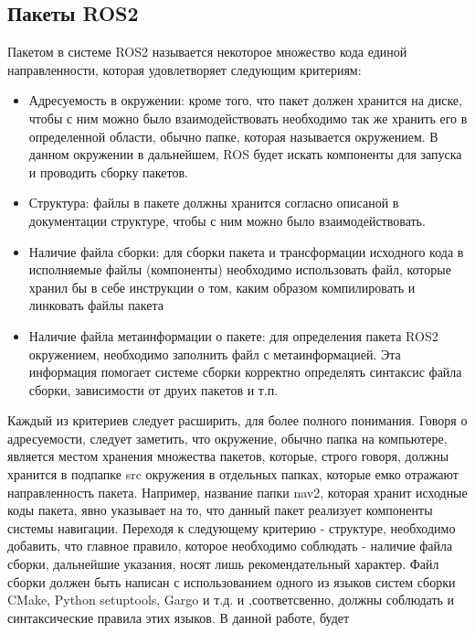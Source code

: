 \documentclass[a4paper, 14pt]{extreport}
\begin{document}
\subsection{Пакеты ROS2}
\par\noindent Пакетом в системе ROS2 называется некоторое множество кода единой направленности, которая удовлетворяет следующим
 критериям:
\begin{itemize}
        \item Адресуемость в окружении: кроме того, что пакет должен хранится на диске, чтобы с ним можно было взаимодействовать
              необходимо так же хранить его в определенной области, обычно папке, которая называется окружением. В данном окружении
              в дальнейшем, ROS будет искать компоненты для запуска и проводить сборку пакетов.
        \item Структура: файлы в пакете должны хранится согласно описаной в документации структуре, чтобы с ним можно было взаимодействовать.
        \item Наличие файла сборки: для сборки пакета и трансформации исходного кода в исполняемые файлы (компоненты) необходимо
              использовать файл, которые хранил бы в себе инструкции о том, каким образом компилировать и линковать файлы пакета
        \item Наличие файла метаинформации о пакете: для определения пакета ROS2 окружением, необходимо заполнить файл с метаинформацией.
              Эта информация помогает системе сборки корректно определять синтаксис файла сборки, зависимости от друих пакетов и т.п. 
\end{itemize}
\par\noindent Каждый из критериев следует расширить, для более полного понимания. Говоря о адресуемости, следует заметить, что 
окружение, обычно папка на компьютере, является местом хранения множества пакетов, которые, строго говоря, должны хранится в 
подпапке src окружения в отдельных папках, которые емко отражают направленность пакета. Например, название папки nav2, которая хранит
исходные коды пакета, явно указывает на то, что данный пакет реализует компоненты системы навигации. Переходя к следующему критерию -
структуре, необходимо добавить, что главное правило, которое необходимо соблюдать - наличие файла сборки, дальнейшие указания,
носят лишь рекомендательный характер. Файл сборки должен быть написан с использованием одного из языков систем сборки CMake\cite{cmakeBook}\cite{cmakeArt},
Python setuptools, Gargo и т.д. и ,соответсвенно, должны соблюдать и синтаксические правила этих языков. В данной работе, будет
\end{document}
